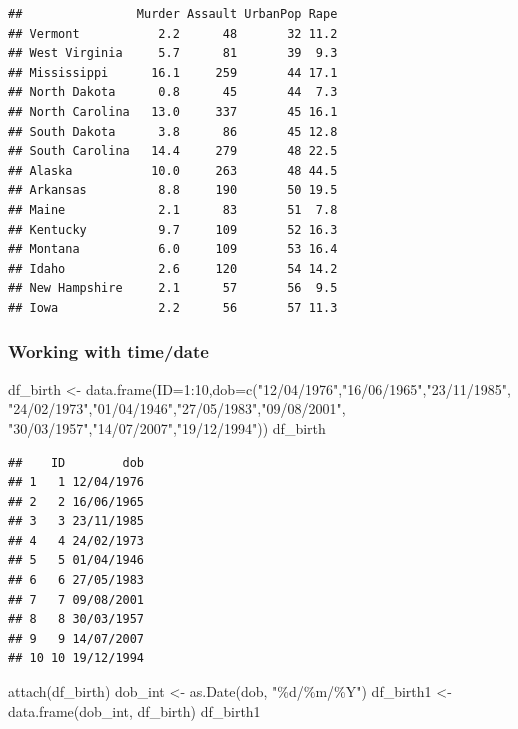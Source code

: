 \documentclass[]{article}
\newenvironment{Shaded}{\begin{snugshade}}{\end{snugshade}}
\newcommand{\AttributeTok}[1]{\textcolor[rgb]{0.77,0.63,0.00}{#1}}
\newcommand{\DecValTok}[1]{\textcolor[rgb]{0.00,0.00,0.81}{#1}}
\newcommand{\FunctionTok}[1]{\textcolor[rgb]{0.00,0.00,0.00}{#1}}
\newcommand{\NormalTok}[1]{#1}
\newcommand{\OtherTok}[1]{\textcolor[rgb]{0.56,0.35,0.01}{#1}}
\newcommand{\SpecialCharTok}[1]{\textcolor[rgb]{0.00,0.00,0.00}{#1}}
\newcommand{\StringTok}[1]{\textcolor[rgb]{0.31,0.60,0.02}{#1}}
\begin{document}
\begin{verbatim}
##                Murder Assault UrbanPop Rape
## Vermont           2.2      48       32 11.2
## West Virginia     5.7      81       39  9.3
## Mississippi      16.1     259       44 17.1
## North Dakota      0.8      45       44  7.3
## North Carolina   13.0     337       45 16.1
## South Dakota      3.8      86       45 12.8
## South Carolina   14.4     279       48 22.5
## Alaska           10.0     263       48 44.5
## Arkansas          8.8     190       50 19.5
## Maine             2.1      83       51  7.8
## Kentucky          9.7     109       52 16.3
## Montana           6.0     109       53 16.4
## Idaho             2.6     120       54 14.2
## New Hampshire     2.1      57       56  9.5
## Iowa              2.2      56       57 11.3
\end{verbatim}

\hypertarget{working-with-timedate}{%
\subsubsection{Working with time/date}\label{working-with-timedate}}

\begin{Shaded}
\begin{Highlighting}[]
\NormalTok{df\_birth }\OtherTok{\textless{}{-}} \FunctionTok{data.frame}\NormalTok{(}\AttributeTok{ID=}\DecValTok{1}\SpecialCharTok{:}\DecValTok{10}\NormalTok{,}\AttributeTok{dob=}\FunctionTok{c}\NormalTok{(}\StringTok{"12/04/1976"}\NormalTok{,}\StringTok{"16/06/1965"}\NormalTok{,}\StringTok{"23/11/1985"}\NormalTok{,}
                      \StringTok{"24/02/1973"}\NormalTok{,}\StringTok{"01/04/1946"}\NormalTok{,}\StringTok{"27/05/1983"}\NormalTok{,}\StringTok{"09/08/2001"}\NormalTok{,}
                      \StringTok{"30/03/1957"}\NormalTok{,}\StringTok{"14/07/2007"}\NormalTok{,}\StringTok{"19/12/1994"}\NormalTok{))}
\NormalTok{df\_birth}
\end{Highlighting}
\end{Shaded}

\begin{verbatim}
##    ID        dob
## 1   1 12/04/1976
## 2   2 16/06/1965
## 3   3 23/11/1985
## 4   4 24/02/1973
## 5   5 01/04/1946
## 6   6 27/05/1983
## 7   7 09/08/2001
## 8   8 30/03/1957
## 9   9 14/07/2007
## 10 10 19/12/1994
\end{verbatim}

\begin{Shaded}
\begin{Highlighting}[]
\FunctionTok{attach}\NormalTok{(df\_birth)}
\NormalTok{dob\_int }\OtherTok{\textless{}{-}} \FunctionTok{as.Date}\NormalTok{(dob, }\StringTok{"\%d/\%m/\%Y"}\NormalTok{)}
\NormalTok{df\_birth1 }\OtherTok{\textless{}{-}} \FunctionTok{data.frame}\NormalTok{(dob\_int, df\_birth)}
\NormalTok{df\_birth1}
\end{Highlighting}
\end{Shaded}
\end{document}
